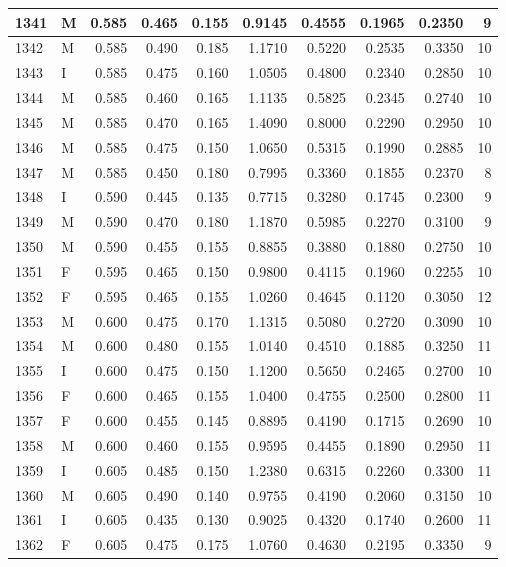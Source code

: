 \documentclass[9pt,twocolumn,twoside,]{pnas-new}
\begin{document}
\begin{tabular}{l|l|r|r|r|r|r|r|r|r}
\hline
1341 & M & 0.585 & 0.465 & 0.155 & 0.9145 & 0.4555 & 0.1965 & 0.2350 & 9\\
\hline
1342 & M & 0.585 & 0.490 & 0.185 & 1.1710 & 0.5220 & 0.2535 & 0.3350 & 10\\
\hline
1343 & I & 0.585 & 0.475 & 0.160 & 1.0505 & 0.4800 & 0.2340 & 0.2850 & 10\\
\hline
1344 & M & 0.585 & 0.460 & 0.165 & 1.1135 & 0.5825 & 0.2345 & 0.2740 & 10\\
\hline
1345 & M & 0.585 & 0.470 & 0.165 & 1.4090 & 0.8000 & 0.2290 & 0.2950 & 10\\
\hline
1346 & M & 0.585 & 0.475 & 0.150 & 1.0650 & 0.5315 & 0.1990 & 0.2885 & 10\\
\hline
1347 & M & 0.585 & 0.450 & 0.180 & 0.7995 & 0.3360 & 0.1855 & 0.2370 & 8\\
\hline
1348 & I & 0.590 & 0.445 & 0.135 & 0.7715 & 0.3280 & 0.1745 & 0.2300 & 9\\
\hline
1349 & M & 0.590 & 0.470 & 0.180 & 1.1870 & 0.5985 & 0.2270 & 0.3100 & 9\\
\hline
1350 & M & 0.590 & 0.455 & 0.155 & 0.8855 & 0.3880 & 0.1880 & 0.2750 & 10\\
\hline
1351 & F & 0.595 & 0.465 & 0.150 & 0.9800 & 0.4115 & 0.1960 & 0.2255 & 10\\
\hline
1352 & F & 0.595 & 0.465 & 0.155 & 1.0260 & 0.4645 & 0.1120 & 0.3050 & 12\\
\hline
1353 & M & 0.600 & 0.475 & 0.170 & 1.1315 & 0.5080 & 0.2720 & 0.3090 & 10\\
\hline
1354 & M & 0.600 & 0.480 & 0.155 & 1.0140 & 0.4510 & 0.1885 & 0.3250 & 11\\
\hline
1355 & I & 0.600 & 0.475 & 0.150 & 1.1200 & 0.5650 & 0.2465 & 0.2700 & 10\\
\hline
1356 & F & 0.600 & 0.465 & 0.155 & 1.0400 & 0.4755 & 0.2500 & 0.2800 & 11\\
\hline
1357 & F & 0.600 & 0.455 & 0.145 & 0.8895 & 0.4190 & 0.1715 & 0.2690 & 10\\
\hline
1358 & M & 0.600 & 0.460 & 0.155 & 0.9595 & 0.4455 & 0.1890 & 0.2950 & 11\\
\hline
1359 & I & 0.605 & 0.485 & 0.150 & 1.2380 & 0.6315 & 0.2260 & 0.3300 & 11\\
\hline
1360 & M & 0.605 & 0.490 & 0.140 & 0.9755 & 0.4190 & 0.2060 & 0.3150 & 10\\
\hline
1361 & I & 0.605 & 0.435 & 0.130 & 0.9025 & 0.4320 & 0.1740 & 0.2600 & 11\\
\hline
1362 & F & 0.605 & 0.475 & 0.175 & 1.0760 & 0.4630 & 0.2195 & 0.3350 & 9\\

\end{tabular}
\end{document}
